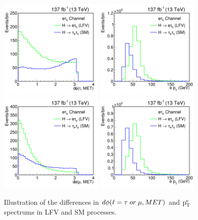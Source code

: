 \begin{figure}[htbp]
  \centering
  \includegraphics[width=0.45\textwidth]{plots/chapter6/LFVvSM/ETdphi.png}
  \includegraphics[width=0.45\textwidth]{plots/chapter6/LFVvSM/ETept.png} \\
  \includegraphics[width=0.45\textwidth]{plots/chapter6/LFVvSM/EMdphi.png}
  \includegraphics[width=0.45\textwidth]{plots/chapter6/LFVvSM/EMept.png} \\
  \caption{Illustration of the differences in $d\phi(\ell = \tau \; or \; \mu, MET)$ and $\text{p}_\text{T}^{\text{e}}$ spectrums in LFV and SM \Htt processes.}
  \label{fig:htt_v_lfv_et}
\end{figure}

